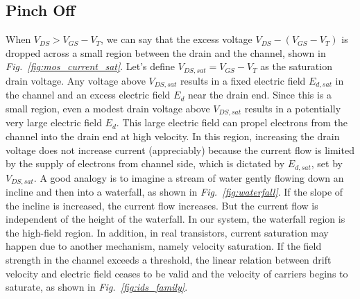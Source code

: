 \subsection{Pinch Off}
When $V_{DS} > V_{GS}-V_T$, we can say that the excess voltage $V_{DS} - (V_{GS}-V_T)$ is dropped across a small region between the drain and the channel, shown in \emph{Fig.~\ref{fig:mos_current_sat}}.  Let's define $V_{DS,sat} = V_{GS}-V_T$ as the saturation drain voltage.  Any voltage above $V_{DS,sat}$ results in a fixed electric field $E_{d,sat}$ in the channel and an excess electric field $E_{d}$ near the drain end.  Since this is a small region, even a modest drain voltage above $V_{DS,sat}$ results in a potentially very large electric field $E_d$.  This large electric field can propel electrons from the channel into the drain end at high velocity.  In this region, increasing the drain voltage does not increase current (appreciably) because the current flow is limited by the supply of electrons from channel side, which is dictated by $E_{d,sat}$, set by $V_{DS,sat}$.  A good analogy is to imagine a stream of water gently flowing down an incline and then into a waterfall, as shown in \emph{Fig.~\ref{fig:waterfall}}.  If the slope of the incline is increased, the current flow increases.  But the current flow is independent of the height of the waterfall.  In our system, the waterfall region is the high-field region.  
In addition, in real transistors, current saturation may happen due to another mechanism, namely velocity saturation. If the field strength in the channel exceeds a threshold, the linear relation between drift velocity and electric field ceases to be valid and the velocity of carriers begins to saturate, as shown in \emph{Fig.~\ref{fig:ids_family}}.
